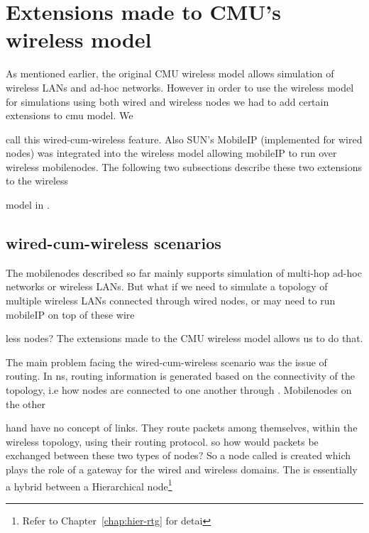 {\section{Extensions made to CMU's wireless model}
\label{sec:wireless-extensions}

As mentioned earlier, the original CMU wireless model allows simulation of wireless LANs and ad-hoc networks. However in order to use the wireless model for simulations using both wired and wireless nodes we had to add certain extensions to cmu model. We 









call this wired-cum-wireless feature. Also SUN's MobileIP (implemented for wired nodes) was integrated into the wireless model allowing mobileIP to run over wireless mobilenodes. The following two subsections describe these two extensions to the wireless 









model in \ns. 


\subsection{wired-cum-wireless scenarios}
\label{sec:wired-cum-wireless}

The mobilenodes described so far mainly supports simulation of multi-hop ad-hoc networks or wireless LANs. But what if we need to simulate a topology of multiple wireless LANs connected through wired nodes, or may need to run mobileIP on top of these wire









less nodes? The extensions made to the CMU wireless model allows us to do that.

The main problem facing the wired-cum-wireless scenario was the issue of routing. In ns, routing information is generated based on the connectivity of the topology, i.e how nodes are connected to one another through . Mobilenodes on the other 









hand have no concept of links. They route packets among themselves, within the wireless topology, using their routing protocol. so how would packets be exchanged between these two types of nodes?
So a node called  is created which plays the role of a gateway for the wired and wireless domains. The  is essentially a hybrid between a Hierarchical node\footnote{Refer to Chapter~\ref{chap:hier-rtg} for detai









}}
